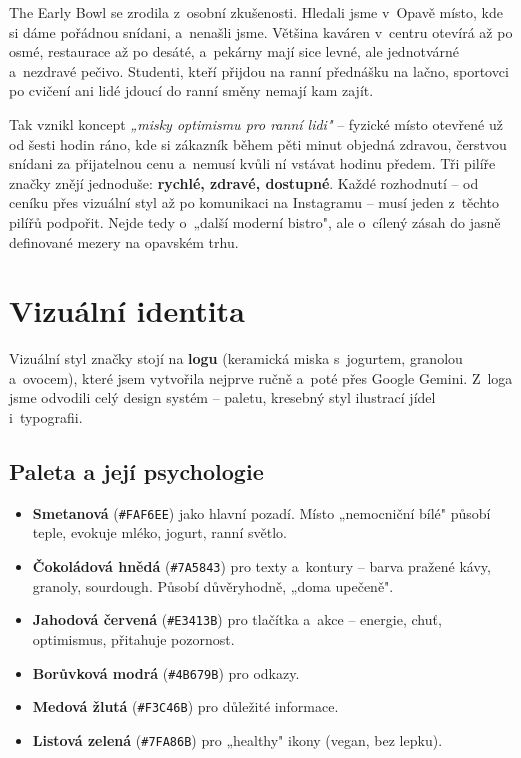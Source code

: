 \documentclass[12pt,a4paper]{article}
\begin{document}
The Early Bowl se zrodila z~osobní zkušenosti. Hledali jsme v~Opavě místo, kde si dáme pořádnou snídani, a~nenašli jsme. Většina kaváren v~centru otevírá až po osmé, restaurace až po desáté, a~pekárny mají sice levné, ale jednotvárné a~nezdravé pečivo. Studenti, kteří přijdou na ranní přednášku na lačno, sportovci po cvičení ani lidé jdoucí do ranní směny nemají kam zajít.

Tak vznikl koncept \emph{„misky optimismu pro ranní lidi"} -- fyzické místo otevřené už od šesti hodin ráno, kde si zákazník během pěti minut objedná zdravou, čerstvou snídani za přijatelnou cenu a~nemusí kvůli ní vstávat hodinu předem. Tři pilíře značky znějí jednoduše: \textbf{rychlé, zdravé, dostupné}. Každé rozhodnutí -- od ceníku přes vizuální styl až po komunikaci na Instagramu -- musí jeden z~těchto pilířů podpořit. Nejde tedy o~„další moderní bistro", ale o~cílený zásah do jasně definované mezery na opavském trhu.

\section{Vizuální identita}

Vizuální styl značky stojí na \textbf{logu} (keramická miska s~jogurtem, granolou a~ovocem), které jsem vytvořila nejprve ručně a~poté přes Google Gemini. Z~loga jsme odvodili celý design systém -- paletu, kresebný styl ilustrací jídel i~typografii.

\subsection{Paleta a její psychologie}

\begin{itemize}
  \item \textbf{Smetanová} (\texttt{\#FAF6EE}) jako hlavní pozadí. Místo „nemocniční bílé" působí teple, evokuje mléko, jogurt, ranní světlo.
  \item \textbf{Čokoládová hnědá} (\texttt{\#7A5843}) pro texty a~kontury -- barva pražené kávy, granoly, sourdough. Působí důvěryhodně, „doma upečeně".
  \item \textbf{Jahodová červená} (\texttt{\#E3413B}) pro tlačítka a~akce -- energie, chuť, optimismus, přitahuje pozornost.
  \item \textbf{Borůvková modrá} (\texttt{\#4B679B}) pro odkazy.
  \item \textbf{Medová žlutá} (\texttt{\#F3C46B}) pro důležité informace.
  \item \textbf{Listová zelená} (\texttt{\#7FA86B}) pro „healthy" ikony (vegan, bez lepku).
\end{itemize}
\end{document}

